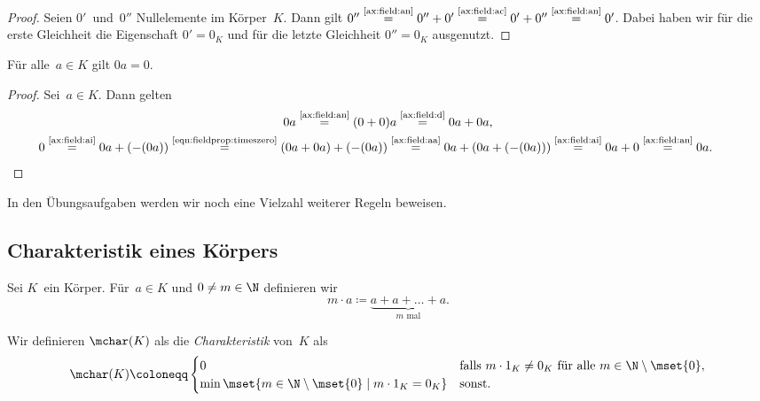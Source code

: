 \documentclass[a4paper]{article}
\begin{document}
\begin{proof}
    Seien $0'$~und~$0''$ Nullelemente im Körper~$K$. Dann gilt $0'' \overset{\text{\ref{ax:field:an}}}{=} 0''+0' \overset{\text{\ref{ax:field:ac}}}{=} 0'+0'' \overset{\text{\ref{ax:field:an}}}{=} 0'$. Dabei haben wir für die erste Gleichheit die Eigenschaft $0' = 0_K$ und für die letzte Gleichheit $0'' = 0_K$ ausgenutzt.
\end{proof}

\begin{lemma}
    Für alle~$a \in K$ gilt $0a = 0$.
\end{lemma}

\begin{proof}
    Sei~$a \in K$. Dann gelten
    \begin{gather}
        0a \overset{\text{\ref{ax:field:an}}}{=} (0+0)a \overset{\text{\ref{ax:field:d}}}{=} 0a + 0a, \label{eqn:fieldprop:timeszero}\\
        0 \overset{\text{\ref{ax:field:ai}}}{=} 0a + (-(0a)) \overset{\text{\eqref{eqn:fieldprop:timeszero}}}{=} (0a + 0a) + (-(0a)) \overset{\text{\ref{ax:field:aa}}}{=} 0a + (0a + (-(0a))) \overset{\text{\ref{ax:field:ai}}}{=} 0a + 0 \overset{\text{\ref{ax:field:an}}}{=} 0a. \tag*{\qedhere}
    \end{gather}
\end{proof}

In den Übungsaufgaben werden wir noch eine Vielzahl weiterer Regeln beweisen.

\subsection{Charakteristik eines Körpers}

\begin{notation}
    Sei $K$~ein Körper. Für~$a \in K$ und $0 \neq m \in \N$ definieren wir
    \begin{equation*}
        m \cdot a \coloneqq \underbrace{a + a + \dots + a }_\text{$m$ mal}.
    \end{equation*}
\end{notation}

\begin{definition}[Charakteristik]
    Wir definieren $\mchar(K)$ als die \emph{Charakteristik} von~$K$ als
    \begin{equation*}
        \mchar(K) \coloneqq \begin{cases}
            0 & \text{falls $m \cdot 1_K \neq 0_K$ für alle $m \in \N \setminus \mset{0}$}, \\
            \min\mset{m \in \N \setminus \mset{0} \mid m \cdot 1_K = 0_K} & \text{sonst}.
        \end{cases}
    \end{equation*}
\end{definition}
\end{document}
